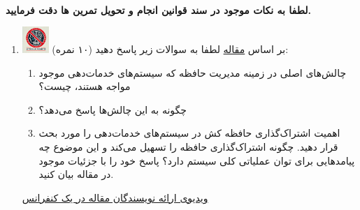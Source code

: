 \documentclass[12pt]{article}
\begin{document}
\fontsize{12pt}{14pt}\selectfont



\\
{\fontsize{14}{22}\selectfont \textbf{لطفا به نکات موجود در سند قوانین انجام و تحویل تمرین ها دقت فرمایید. }}

\begin{enumerate}

    \section*{سوالات تئوری}
    \item \includegraphics[width=1cm]{figs/Forbidden_AI.jpg}
    بر اساس \href{https://arxiv.org/abs/2309.06180}{ مقاله} لطفا به سوالات زیر پاسخ دهید (۱۰ نمره):
    \begin{enumerate}
        \item چالش‌های اصلی در زمینه مدیریت حافظه که سیستم‌های خدمات‌دهی  موجود مواجه هستند، چیست؟
        \item  {} چگونه به این چالش‌ها پاسخ می‌دهد؟ 
        \item اهمیت اشتراک‌گذاری حافظه کش  در سیستم‌های خدمات‌دهی  را مورد بحث قرار دهید.  چگونه اشتراک‌گذاری حافظه را تسهیل می‌کند و این موضوع چه پیامدهایی برای توان عملیاتی کلی سیستم دارد؟ پاسخ خود را با جزئیات موجود در مقاله بیان کنید.
    \end{enumerate}
     
    
    
    \href{https://www.youtube.com/watch?v=5ZlavKF_98U}{ویدیوی ارائه نویسندگان مقاله در یک کنفرانس}


\end{enumerate}
\end{document}
